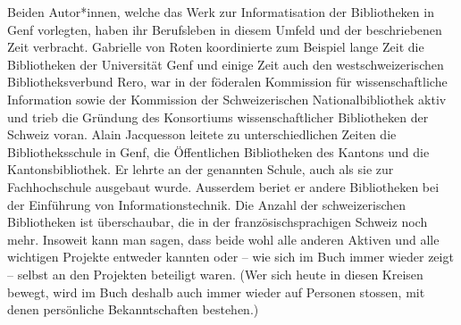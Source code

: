 \documentclass[a4paper,
fontsize=11pt,
oneside,
numbers=noperiodatend,
parskip=half-,
bibliography=totoc,
final
]{scrartcl}
\begin{document}
Beiden Autor*innen, welche das Werk zur Informatisation der Bibliotheken
in Genf vorlegten, haben ihr Berufsleben in diesem Umfeld und der
beschriebenen Zeit verbracht. Gabrielle von Roten koordinierte zum
Beispiel lange Zeit die Bibliotheken der Universität Genf und einige
Zeit auch den westschweizerischen Bibliotheksverbund Rero, war in der
föderalen Kommission für wissenschaftliche Information sowie der
Kommission der Schweizerischen Nationalbibliothek aktiv und trieb die
Gründung des Konsortiums wissenschaftlicher Bibliotheken der Schweiz
voran. Alain Jacquesson leitete zu unterschiedlichen Zeiten die
Bibliotheksschule in Genf, die Öffentlichen Bibliotheken des Kantons und
die Kantonsbibliothek. Er lehrte an der genannten Schule, auch als sie
zur Fachhochschule ausgebaut wurde. Ausserdem beriet er andere
Bibliotheken bei der Einführung von Informationstechnik. Die Anzahl der
schweizerischen Bibliotheken ist überschaubar, die in der
französischsprachigen Schweiz noch mehr. Insoweit kann man sagen, dass
beide wohl alle anderen Aktiven und alle wichtigen Projekte entweder
kannten oder -- wie sich im Buch immer wieder zeigt -- selbst an den
Projekten beteiligt waren. (Wer sich heute in diesen Kreisen bewegt,
wird im Buch deshalb auch immer wieder auf Personen stossen, mit denen
persönliche Bekanntschaften bestehen.)
\end{document}
